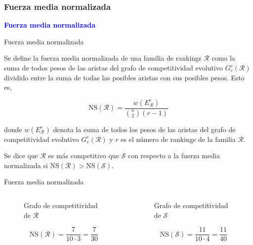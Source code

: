 \documentclass[10pt,hyperref={unicode}]{beamer}
\begin{document}
	\subsubsection{Fuerza media normalizada}
	
	\begin{frame}
		\begin{center}
			\Huge\textbf{\textsf{\textcolor{blue}{Fuerza media normalizada}}}
		\end{center}
	\end{frame}
	
	\begin{frame}{Fuerza media normalizada}
		\begin{defi}
			Se define la fuerza media normalizada de una familia de rankings $\mathcal{R}$ como la suma de todos pesos de las aristas del grafo de competitividad evolutivo $G_c^e(\mathcal{R})$ dividido entre la suma de todas las posibles aristas con sus posibles pesos. Esto es,
			
			\begin{equation}
			\mathrm{NS}(\mathcal{R}) = \dfrac{w(E_\mathcal{R}^e)}{\binom{n}{2} (r-1)}
			\end{equation} 
			
			donde $w(E_\mathcal{R}^e)$ denota la suma de todos los pesos de las aristas del grafo de competitividad evolutivo $G_c^e(\mathcal{R})$ y $r$ es el número de rankings de la familia $\mathcal{R}$.
		\end{defi}
		
		\begin{defi}
			Se dice que $\mathcal{R}$ es más competitivo que $\mathcal{S}$ con respecto a la fuerza media normalizada si $\mathrm{NS}(\mathcal{R}) > \mathrm{NS}(\mathcal{S})$.
		\end{defi}
	\end{frame}
	
	\begin{frame}{Fuerza media normalizada}
		\begin{ejemplo}
			\begin{columns}[t] %
				\begin{column}{.50\textwidth}
					\begin{figure}
						\centering
						\resizebox{!}{0.3\textheight}{\ejemplografocompetitividadevolutivo}
						\caption{Grafo de competitividad de $\mathcal{R}$}
					\end{figure}
					\[ \mathrm{NS}(\mathcal{R}) = \dfrac{7}{10 \cdot 3} = \dfrac{7}{30} \]
				\end{column}%
				\hfill%
				\begin{column}{.50\textwidth}
					\begin{figure}
						\centering
						\resizebox{!}{0.3\textheight}{\ejemplofuerzamedia}
						\caption{Grafo de competitividad de $\mathcal{S}$}
					\end{figure}
					\[ \mathrm{NS}(\mathcal{S}) = \dfrac{11}{10\cdot 4} = \dfrac{11}{40} \]
				\end{column}%
			\end{columns}
		\end{ejemplo}
	\end{frame}
	
\end{document}
